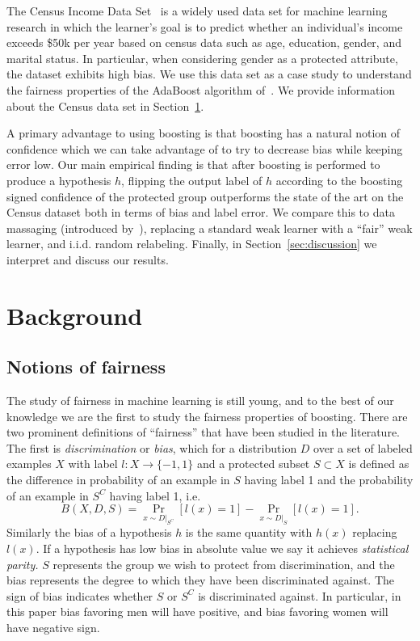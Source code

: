 \documentclass{article}
\begin{document}
The Census Income Data Set~\citep{UCIAdult} is a widely used data set for
machine learning research in which the learner's goal is to predict whether an
individual's income exceeds \$50k per year based on census data such as age,
education, gender, and marital status. In particular, when considering gender
as a protected attribute, the dataset exhibits high bias. We use this data set
as a case study to understand the fairness properties of the AdaBoost algorithm
of~\citet{FreundS97}. We provide information
about the Census data set in Section~\ref{sec:background}.

A primary advantage to using boosting is that boosting has a natural notion of
confidence which we can take advantage of to try to decrease bias while keeping
error low.  Our main empirical finding is that after boosting is performed to
produce a hypothesis $h$, flipping the output label of $h$ according to the
boosting signed confidence of the protected group outperforms the state of the art on the
Census dataset both in terms of bias and label error. We compare this to data
massaging (introduced by~\citet{KamiranC09}), replacing a standard weak learner
with a ``fair'' weak learner, and i.i.d. random relabeling. Finally, in
Section~\ref{sec:discussion} we interpret and discuss our results. 

\section{Background} \label{sec:background}

\subsection{Notions of fairness} The study of fairness in machine learning is
still young, and to the best of our knowledge we are the first to study the
fairness properties of boosting.  There are two prominent definitions of
``fairness'' that have been studied in the literature. The first is
\emph{discrimination} or \emph{bias}, which for a distribution $D$ over a set
of labeled examples $X$ with label $l : X \to \{-1, 1\}$ and a protected subset
$S \subset X$ is defined as the difference in probability of an example in $S$
having label 1 and the probability of an example in $S^C$ having label 1, i.e.
$$ B(X, D, S) = \Pr_{x \sim D|_{S^C}}[l(x) = 1] - \Pr_{x \sim D|_{S}}
[l(x) = 1].$$
Similarly the bias of a hypothesis $h$ is the same
quantity with $h(x)$ replacing $l(x)$. If a hypothesis has low bias
in absolute value we say it achieves \emph{statistical parity.}
$S$ represents the group we wish to
protect from discrimination, and the bias represents the degree to which they
have been discriminated against.
The sign of bias indicates whether $S$ or $S^C$ is discriminated against.
In particular, in this paper
bias favoring men will have positive, and bias favoring women
will have negative sign.
\end{document}
